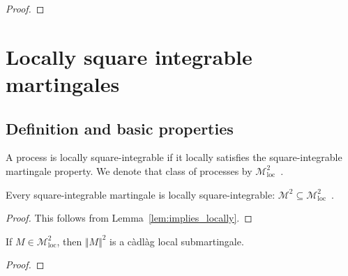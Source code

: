 \begin{proof}

\end{proof}



\section{Locally square integrable martingales}

\subsection{Definition and basic properties}

\begin{definition}\label{def:IsLocallySquareIntegrable}
  \leanok
A process is locally square-integrable if it locally satisfies the square-integrable martingale property.
We denote that class of processes by $\mathcal{M}^2_{\mathrm{loc}}$~.
\end{definition}


\begin{lemma}\label{lem:IsSquareIntegrable.isLocallySquareIntegrable}
  \leanok
Every square-integrable martingale is locally square-integrable: $\mathcal{M}^2 \subseteq \mathcal{M}^2_{\mathrm{loc}}$~.
\end{lemma}

\begin{proof}\leanok
This follows from Lemma~\ref{lem:implies_locally}.
\end{proof}


\begin{lemma}\label{lem:IsLocallySquareIntegrable.isLocalSubmartingale_sq_norm}
  \leanok
If $M \in \mathcal{M}^2_{\mathrm{loc}}$, then $\Vert M \Vert^2$ is a càdlàg local submartingale.
\end{lemma}

\begin{proof}\leanok

\end{proof}


